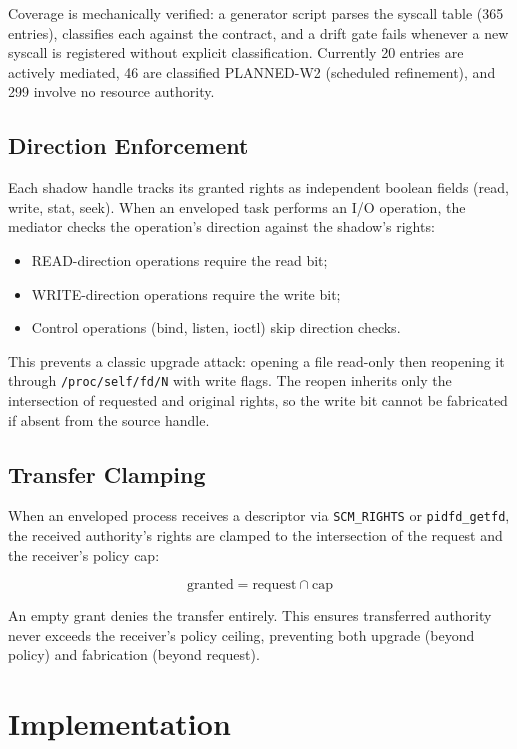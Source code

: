\documentclass[letterpaper,twocolumn,10pt]{article}
\begin{document}
Coverage is mechanically verified: a generator script parses the
syscall table (365 entries), classifies each against the contract, and
a drift gate fails whenever a new syscall is registered without
explicit classification.  Currently 20 entries are actively mediated,
46 are classified PLANNED-W2 (scheduled refinement), and 299 involve
no resource authority.

\subsection{Direction Enforcement}

Each shadow handle tracks its granted rights as independent boolean
fields (read, write, stat, seek).  When an enveloped task performs an
I/O operation, the mediator checks the operation's direction against
the shadow's rights:

\begin{itemize}
\item READ-direction operations require the read bit;
\item WRITE-direction operations require the write bit;
\item Control operations (bind, listen, ioctl) skip direction checks.
\end{itemize}

This prevents a classic upgrade attack: opening a file read-only then
reopening it through \texttt{/proc/self/fd/N} with write flags.  The
reopen inherits only the intersection of requested and original rights,
so the write bit cannot be fabricated if absent from the source handle.

\subsection{Transfer Clamping}

When an enveloped process receives a descriptor via
\texttt{SCM\_RIGHTS} or \texttt{pidfd\_getfd}, the received authority's
rights are clamped to the intersection of the request and the
receiver's policy cap:

\[
  \text{granted} = \text{request} \cap \text{cap}
\]

An empty grant denies the transfer entirely.  This ensures transferred
authority never exceeds the receiver's policy ceiling, preventing both
upgrade (beyond policy) and fabrication (beyond request).

\section{Implementation}
\label{sec:impl}
\end{document}
